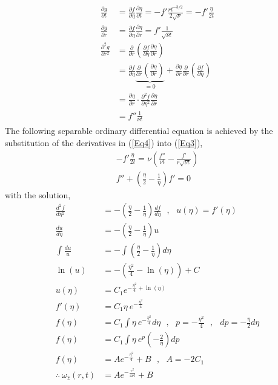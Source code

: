\documentclass{article}
\begin{document}
\begin{align}\label{Eq4}
\begin{split}
    \frac{\partial g}{\partial t} &= \frac{\partial f}{\partial \eta}\frac{\partial \eta}{\partial t} = -f' \frac{r t^{-3/2}}{2\sqrt{\nu}}= -f' \frac{\eta}{2t}\\
    \frac{\partial g}{\partial r}&=\frac{\partial f}{\partial \eta}\frac{\partial \eta}{\partial r} = f' \frac{1}{\sqrt{\nu t}}\\
    \frac{\partial^2 g}{\partial r^2} &=\frac{\partial }{\partial r}\left( \frac{\partial f}{\partial \eta}\frac{\partial \eta}{\partial r} \right) \\
    &=\frac{\partial f}{\partial \eta}\underbrace{\frac{\partial}{\partial r}\left ( \frac{\partial \eta}{\partial r} \right ) }_{=0}
    + \frac{\partial \eta}{\partial r}\frac{\partial }{\partial r}\left ( \frac{\partial f}{\partial \eta} \right ) \\
    &= \frac{\partial \eta}{\partial r} \cdot \frac{\partial^2 f}{\partial \eta^2} \frac{\partial \eta}{\partial r}\\
    &= f'' \frac{1}{\nu t}
\end{split}
\end{align}
The following separable ordinary differential equation is achieved by the substitution of the derivatives in (\ref{Eq4}) into (\ref{Eq3}),
\begin{align*}
    -f'\frac{\eta}{2t}=\nu \left( \frac{f''}{\nu t}-\frac{f'}{r\sqrt{\nu t}} \right)\\
    f'' + \left( \frac{\eta}{2}-\frac{1}{\eta} \right)f' =0
\end{align*}
with the solution,
\begin{align*}
    \frac{d^2 f}{d\eta^2} &=-\left( \frac{\eta}{2}-\frac{1}{\eta} \right)\frac{df}{d\eta} \:\:\:,\:\:\: u(\eta)=f'(\eta)\\
    \frac{d u}{d\eta} &=-\left( \frac{\eta}{2}-\frac{1}{\eta} \right)u \\
    \int \frac{d u}{u} &= -\int \left( \frac{\eta}{2}-\frac{1}{\eta} \right)d\eta \\
    \ln(u) &= - \left( \frac{\eta^2}{4}-\ln(\eta) \right)+C \\
    u(\eta) &= C_1e^{-\frac{\eta^2}{4}+\ln(\eta)} \\
    f'(\eta) &= C_1\eta \: e^{-\frac{\eta^2}{4}} \\
    f(\eta) &= C_1 \int \eta\: e^{-\frac{\eta^2}{4}} d\eta \:\:\:,\:\:\: p=-\frac{\eta^2}{4}\:\:\:,\:\;\: dp=-\frac{\eta}{2}d\eta \\
    f(\eta) &= C_1 \int \eta\: e^{p} \left( -\frac{2}{\eta} \right) dp \\
    f(\eta) &= A e^{-\frac{\eta^2}{4}} +B \:\:\:,\:\:\: A =-2C_1\\
    \therefore \: \omega_{\hat{z}}(r,t) &= A e^{-\frac{r^2}{4\nu t}}+B
\end{align*}
\end{document}
